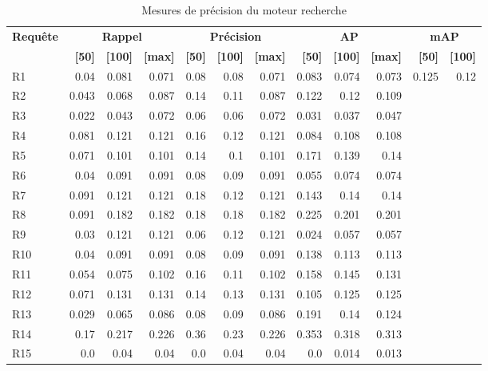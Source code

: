 \begin{table}[H]
\centering
\begin{tabular}{l|rrr|rrr|rrr|rr}
\toprule
\textbf{Requête} & \multicolumn{3}{c}{\textbf{Rappel}} & \multicolumn{3}{c}{\textbf{Précision}} & \multicolumn{3}{c}{\textbf{AP}} & \multicolumn{2}{c}{\textbf{mAP}} \\
 & \textbf{[50]} & \textbf{[100]} & \textbf{[max]} & \textbf{[50]} & \textbf{[100]} & \textbf{[max]} & \textbf{[50]} & \textbf{[100]} & \textbf{[max]} & \textbf{[50]} & \textbf{[100]} \\
\midrule
R1 & 0.04 & 0.081 & 0.071 & 0.08 & 0.08 & 0.071 & 0.083 & 0.074 & 0.073 & \multirow{15}{*}{0.125} & \multirow{15}{*}{0.12} \\
R2 & 0.043 & 0.068 & 0.087 & 0.14 & 0.11 & 0.087 & 0.122 & 0.12 & 0.109 \\
R3 & 0.022 & 0.043 & 0.072 & 0.06 & 0.06 & 0.072 & 0.031 & 0.037 & 0.047 \\
R4 & 0.081 & 0.121 & 0.121 & 0.16 & 0.12 & 0.121 & 0.084 & 0.108 & 0.108 \\
R5 & 0.071 & 0.101 & 0.101 & 0.14 & 0.1 & 0.101 & 0.171 & 0.139 & 0.14 \\
R6 & 0.04 & 0.091 & 0.091 & 0.08 & 0.09 & 0.091 & 0.055 & 0.074 & 0.074 \\
R7 & 0.091 & 0.121 & 0.121 & 0.18 & 0.12 & 0.121 & 0.143 & 0.14 & 0.14 \\
R8 & 0.091 & 0.182 & 0.182 & 0.18 & 0.18 & 0.182 & 0.225 & 0.201 & 0.201 \\
R9 & 0.03 & 0.121 & 0.121 & 0.06 & 0.12 & 0.121 & 0.024 & 0.057 & 0.057 \\
R10 & 0.04 & 0.091 & 0.091 & 0.08 & 0.09 & 0.091 & 0.138 & 0.113 & 0.113 \\
R11 & 0.054 & 0.075 & 0.102 & 0.16 & 0.11 & 0.102 & 0.158 & 0.145 & 0.131 \\
R12 & 0.071 & 0.131 & 0.131 & 0.14 & 0.13 & 0.131 & 0.105 & 0.125 & 0.125 \\
R13 & 0.029 & 0.065 & 0.086 & 0.08 & 0.09 & 0.086 & 0.191 & 0.14 & 0.124 \\
R14 & 0.17 & 0.217 & 0.226 & 0.36 & 0.23 & 0.226 & 0.353 & 0.318 & 0.313 \\
R15 & 0.0 & 0.04 & 0.04 & 0.0 & 0.04 & 0.04 & 0.0 & 0.014 & 0.013 \\
\bottomrule
\end{tabular}
\caption{Mesures de précision du moteur recherche}
\label{tab:results}
\end{table}
